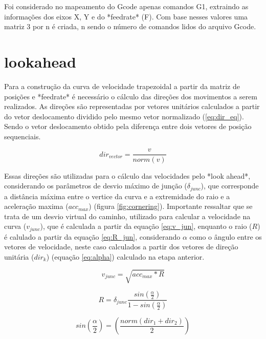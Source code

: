 Foi considerado no mapeamento do Gcode apenas comandos G1, extraindo
as informações dos eixos X, Y e do *feedrate* (F). Com base nesses valores
uma matriz 3 por n é criada, n sendo o número de comandos lidos do arquivo Gcode.

\section{lookahead}
Para a construção da curva de velocidade trapezoidal a partir da matriz de posições
e *feedrate* é necessário o cálculo das direções dos movimentos a serem realizados.
As direções são representadas por vetores unitários calculados a partir
do vetor deslocamento dividido pelo mesmo vetor normalizado (\ref{eq:dir_eq}). Sendo o vetor deslocamento
obtido pela diferença entre dois vetores de posição sequenciais.

\begin{equation}
    \label{eq:dir_eq}
    dir_{vector} = \frac{v}{norm(v)}
\end{equation}

Essas direções são utilizadas para o cálculo das velocidades pelo *look ahead*,
considerando os parâmetros de desvio máximo de junção ($\delta _{junc}$), que corresponde a distância máxima
entre o vertice da curva e a extremidade do raio e a aceleração maxima ($acc_{max}$) (figura \ref{fig:cornering}).
Importante ressaltar que se trata de um desvio virtual do caminho, utilizado para calcular a 
velocidade na curva ($v_{junc}$), que é calculada a partir da equação \ref{eq:v_jun}, enquanto o raio ($R$) é
calulado a partir da equação \ref{eq:R_jun}, considerando $\alpha$ como o ângulo entre os vetores
de velocidade, neste caso calculados a partir dos vetores de direção unitária ($dir_k$) (equação \ref{eq:alpha}) calculado na etapa anterior. 

\begin{equation}
    \label{eq:v_jun}
    v_{junc} = \sqrt{acc_{max}*R}
\end{equation}

\begin{equation}
    \label{eq:R_jun}
    R = \delta _{junc} \frac{sin\left(\frac{\alpha}{2}\right)}{1-sin\left(\frac{\alpha}{2}\right)}
\end{equation}

\begin{equation}
    \label{eq:alpha}
    sin\left(\frac{\alpha}{2}\right) = \left(\frac{norm(dir_1+dir_2)}{2}\right)
\end{equation}

